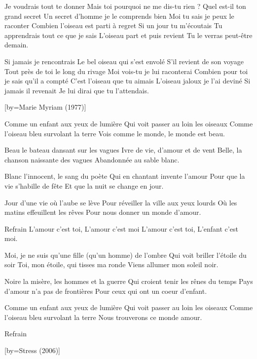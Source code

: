 \beginverse
Je voudrais tout te donner
Mais toi pourquoi ne me dis-tu rien ?
Quel est-il ton grand secret
Un secret d'homme je le comprends bien
Moi tu sais je peux le raconter
Combien l'oiseau est parti à regret
Si un jour tu m'écoutais
Tu apprendrais tout ce que je sais
L'oiseau part et puis revient
Tu le verras peut-être demain.
\endverse

\beginverse
Si jamais je rencontrais
Le bel oiseau qui s'est envolé
S'il revient de son voyage
Tout près de toi le long du rivage
Moi vois-tu je lui raconterai
Combien pour toi je sais qu'il a compté
C'est l'oiseau que tu aimais
L'oiseau jaloux je l'ai deviné
Si jamais il revenait
Je lui dirai que tu l'attendais.
\endverse

[by={Marie Myriam (1977)}]

\beginverse
Comme un enfant aux yeux de lumière
Qui voit passer au loin les oiseaux
Comme l'oiseau bleu survolant la terre
Vois comme le monde, le monde est beau.
\endverse

\beginverse
Beau le bateau dansant sur les vagues
Ivre de vie, d'amour et de vent
Belle, la chanson naissante des vagues
Abandonnée au sable blanc.
\endverse

\beginverse
Blanc l'innocent, le sang du poète
Qui en chantant invente l'amour
Pour que la vie s'habille de fête
Et que la nuit se change en jour.
\endverse

\beginverse
Jour d'une vie où l'aube se lève
Pour réveiller la ville aux yeux lourds
Où les matins effeuillent les rêves
Pour nous donner un monde d'amour.
\endverse

\beginverse
Refrain
L'amour c'est toi, L'amour c'est moi
L'amour c'est toi, L'enfant c'est moi.
\endverse

\beginverse
Moi, je ne suis qu'une fille (qu'un homme) de l'ombre
Qui voit briller l'étoile du soir
Toi, mon étoile, qui tisses ma ronde
Viens allumer mon soleil noir.
\endverse

\beginverse
Noire la misère, les hommes et la guerre
Qui croient tenir les rênes du temps
Pays d'amour n'a pas de frontières
Pour ceux qui ont un coeur d’enfant.
\endverse

\beginverse
Comme un enfant aux yeux de lumière
Qui voit passer au loin les oiseaux
Comme l’oiseau bleu survolant la terre
Nous trouverons ce monde amour.
\endverse

\beginverse
Refrain
\endverse

[by={Stress (2006)}]

